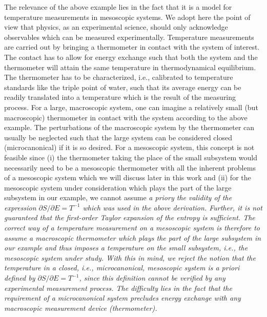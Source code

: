 \documentclass[sort&compress,final,numberedheadings]{aipproc}
\begin{document}
The relevance of the above example lies in the fact that it is a model for 
temperature measurements in mesoscopic systems. We adopt here the point of view
that physics, as an experimental science, should only acknowledge observables
which can be measured experimentally. Temperature measurements are carried out
by bringing a thermometer in contact with the system of interest. The contact 
has to allow for energy exchange such that both the system and the thermometer
will attain the same temperature in thermodynamical equilibrium. The 
thermometer has to be characterized, i.e., calibrated to temperature standards 
like the triple point of water, such that its average energy can be readily 
translated into a temperature which is the result of the measuring process. For
a large, macroscopic system, one can imagine a relatively small (but 
macroscopic) thermometer in contact with the system according to the above 
example. The perturbations of the macroscopic system by the thermometer can 
usually be neglected such that the large system can be considered closed 
(microcanonical) if it is so desired. For a mesoscopic system, this concept is 
not feasible since (i) the thermometer taking the place of the small subsystem 
would necessarily need to be a mesoscopic thermometer with all the inherent 
problems of a mesoscopic system which we will discuss later in this work and 
(ii) for the mesoscopic system under consideration which plays the part of the 
large subsystem in our example, we cannot assume \em a priory \rm the validity 
of the expression $\partial S/\partial E=T^{-1}$ which was used in the above 
derivation. Further, it is not guaranteed that the first-order Taylor expansion
of the entropy is sufficient. The correct way of a temperature measurement on a
mesoscopic system is therefore to assume a macroscopic thermometer which plays 
the part of the large subsystem in our example and thus imposes a temperature 
on the small subsystem, i.e., the mesoscopic system under study. With this in 
mind, we reject the notion that the temperature in a closed, i.e., 
microcanonical, mesoscopic system is \em a priori \rm defined by 
$\partial S/\partial E=T^{-1}$, since this definition cannot be verified by any
experimental measurement process. The difficulty lies in the fact that the 
requirement of a microcanonical system precludes energy exchange with any 
macroscopic measurement device (thermometer). 
\end{document}
